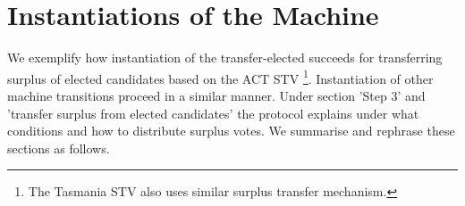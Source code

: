 \documentclass[10pt,conference]{IEEEtran}
\begin{document}
\section{Instantiations of the Machine}\label{sec:InstMachine}
We exemplify how instantiation of the transfer-elected succeeds for transferring surplus of elected candidates based on the ACT STV
\footnote{The Tasmania STV also uses similar surplus transfer mechanism.}. Instantiation of other machine transitions proceed in a  similar manner.    
Under section 'Step 3' and 'transfer surplus from elected candidates' the protocol explains under what conditions and how to distribute surplus votes. We summarise and rephrase these sections as follows. 
\end{document}
